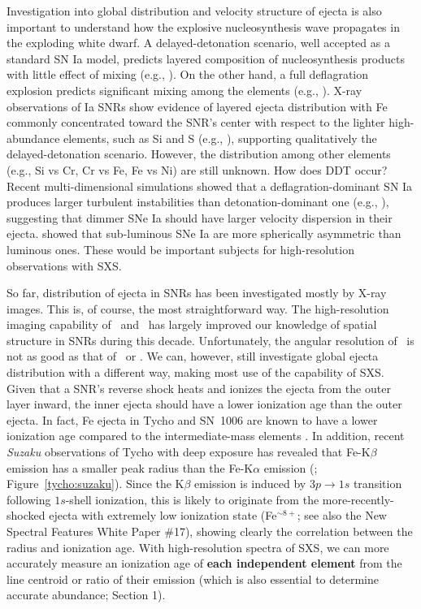 \documentclass[11pt,a4paper]{article}
\begin{document}
{Investigation into global distribution and velocity structure of
ejecta is also important to understand how the explosive
nucleosynthesis wave propagates in the exploding white dwarf. A
delayed-detonation scenario, well accepted as a standard SN Ia model,
predicts layered composition of nucleosynthesis products with little
effect of mixing (e.g., \citealt{maeda10b}).  On the other hand, a
full deflagration explosion predicts significant mixing among the
elements (e.g., \citealt{ropke07}).  X-ray observations of Ia SNRs
show evidence of layered ejecta distribution with Fe commonly
concentrated toward the SNR's center with respect to the lighter
high-abundance elements, such as Si and S (e.g., \citealt{hwang97}),
supporting qualitatively the delayed-detonation scenario.  However,
the distribution among other elements (e.g., Si vs Cr, Cr vs Fe, Fe vs
Ni) are still unknown.  How does DDT occur? Recent multi-dimensional
simulations showed that a deflagration-dominant SN Ia produces larger
turbulent instabilities than detonation-dominant one (e.g.,
\citealt{kasen09}), suggesting that dimmer SNe Ia should have larger
velocity dispersion in their ejecta. \citet{howell01} showed that
sub-luminous SNe Ia are more spherically asymmetric than luminous
ones. These would be important subjects for high-resolution
observations with SXS.


So far, distribution of ejecta in SNRs has been investigated mostly by
X-ray images.  This is, of course, the most straightforward way. The
high-resolution imaging capability of \chandra\ and \xmm\ has largely
improved our knowledge of spatial structure in SNRs during this
decade. Unfortunately, the angular resolution of \ah\ is not as good as
that of \chandra\ or \xmm. We can, however, still investigate global
ejecta distribution with a different way, making most use of the
capability of SXS.  Given that a SNR's reverse shock heats and ionizes
the ejecta from the outer layer inward, the inner ejecta should have a
lower ionization age than the outer ejecta. In fact, Fe ejecta in
Tycho and SN~1006 are known to have a lower ionization age compared to
the intermediate-mass elements \citep{hwang97, yamaguchi08}.  In
addition, recent {\it Suzaku} observations of Tycho with deep exposure
has revealed that Fe-K$\beta$ emission has a smaller peak radius than
the Fe-K$\alpha$ emission (\citealt{yamaguchi13};
Figure~\ref{tycho:suzaku}). Since the K$\beta$ emission is induced by
$3p$$\rightarrow$$1s$ transition following $1s$-shell ionization, this
is likely to originate from the more-recently-shocked ejecta with
extremely low ionization state (Fe$^{\sim 8+}$; see also the New Spectral Features White Paper \#17),
showing clearly the correlation between the radius and ionization age.
With high-resolution spectra of SXS, we can more accurately measure an
ionization age of {\bf each independent element} from the line
centroid or ratio of their emission (which is also essential to
determine accurate abundance; Section 1).

}
\end{document}
